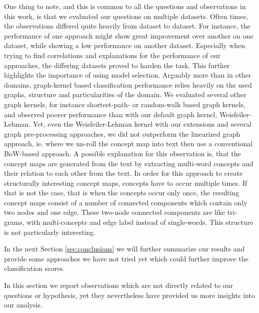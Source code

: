 One thing to note, and this is common to all the questions and observations in this work, is that we evaluated our questions on multiple datasets. Often times, the observations differed quite heavily from dataset to dataset.
For instance, the performance of one approach might show great improvement over another on one dataset, while showing a low performance on another dataset. 
Especially when trying to find correlations and explanations for the performance of our approaches, the differing datasets proved to harden the task.
This further highlights the importance of using model selection.
Arguably more than in other domains,  graph-kernel based classification performance relies heavily on the used graphs, structure and particularities of the domain.
We evaluated several other graph kernels, for instance shortest-path- or random-walk based graph kernels, and observed poorer performance than with our default graph kernel, Weisfeiler-Lehman.
Yet, even the Weisfeiler-Lehman kernel with our extensions and several graph pre-processing approaches, we did not outperform the linearized graph approach, ie. where we un-roll the concept map into text then use a conventional BoW-based approach.
A possible explanation for this observation is, that the concept maps are generated from the text by extracting multi-word concepts and their relation to each other from the text.
In order for this approach to create structurally interesting concept maps, concepts have to occur multiple times.
If that is not the case, that is when the concepts occur only once, the resulting concept maps consist of a number of connected components which contain only two nodes and one edge.
These two-node connected components are like tri-grams, with multi-concepts and edge label instead of single-words.
This structure is not particularly interesting.

In the next Section \ref{sec:conclusions} we will further summarize our results and provide some approaches we have not tried yet which could further improve the classification scores.


In this section we report observations which are not directly related to our questions or hypothesis, yet they nevertheless have provided us more insights into our analysis.



